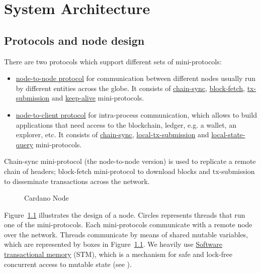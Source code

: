 \chapter{System Architecture}

\section{Protocols and node design}
There are two protocols which support different sets of mini-protocols:
\begin{itemize}
  \item\hyperref[section:node-to-node-protocol]{node-to-node protocol}
    for communication between different nodes usually run by different
    entities across the globe.  It consists of
    \hyperref[chain-sync-protocol]{chain-sync},
    \hyperref[block-fetch-protocol]{block-fetch},
    \hyperref[tx-submission-protocol]{tx-submission} and
    \hyperref[keep-alive-protocol]{keep-alive} mini-protocols.
  \item\hyperref[section:node-to-client-protocol]{node-to-client
    protocol} for intra-process communication, which allows to build
    applications that need access to the blockchain, ledger, e.g. a wallet, an
    explorer, etc.  It consists of \hyperref[chain-sync-protocol]{chain-sync},
    \hyperref[local-tx-submission-protocol]{local-tx-submission} and
    \hyperref[local-state-query-protocol]{local-state-query} mini-protocols.
\end{itemize}

Chain-sync mini-protocol (the node-to-node version) is used to replicate
a remote chain of headers; block-fetch mini-protocol to download blocks and
tx-submission to disseminate transactions across the network.

\begin{figure}
  \begin{center}
  \end{center}
  \caption{Cardano Node}
  \label{node-diagram-concurrency}
\end{figure}

Figure~\ref{node-diagram-concurrency} illustrates the design of a node.  Circles
represents threads that run one of the mini-protocols.
Each mini-protocols communicate with a remote node over the network.
Threads communicate by means of shared mutable variables, which
are represented by boxes in Figure~\ref{node-diagram-concurrency}.
We heavily use
\href{https://en.wikipedia.org/wiki/Software_transactional_memory}{Software
transactional memory} (STM), which is a mechanism for safe and lock-free
concurrent access to mutable state (see \cite{stm:harris2006}).

